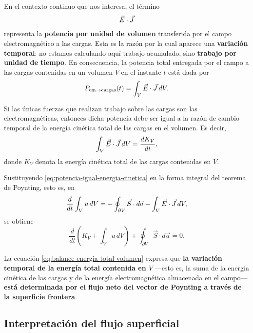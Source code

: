 \documentclass[../main.tex]{subfiles}
\begin{document}
En el contexto continuo que nos interesa, el término
\begin{equation*}
    \vec{E}\cdot\vec{J}
\end{equation*}
representa la \textbf{potencia por unidad de volumen} transferida por el campo electromagnético a las cargas. Esta es la razón por la cual aparece una \textbf{variación temporal}: no estamos calculando aquí trabajo acumulado, sino \textbf{trabajo por unidad de tiempo}. En consecuencia, la potencia total entregada por el campo a las cargas contenidas en un volumen $V$ en el instante $t$ está dada por
\begin{equation*}
    P_{\mathrm{em}\to\mathrm{cargas}}(t)=\int_V \vec{E}\cdot\vec{J}\,dV.
\end{equation*}

Si las únicas fuerzas que realizan trabajo sobre las cargas son las electromagnéticas, entonces dicha potencia debe ser igual a la razón de cambio temporal de la energía cinética total de las cargas en el volumen. Es decir,
\begin{equation}
    \int_V \vec{E}\cdot\vec{J}\,dV=\frac{dK_V}{dt},
    \label{eq:potencia-igual-energia-cinetica}
\end{equation}
donde $K_V$ denota la energía cinética total de las cargas contenidas en $V$.

Sustituyendo \eqref{eq:potencia-igual-energia-cinetica} en la forma integral del teorema de Poynting, esto es, en
\begin{equation*}
    \frac{d}{dt}\int_V u\,dV
    =
    -\oint_{\partial V}\vec S\cdot d\vec a
    -
    \int_V \vec{E}\cdot\vec{J}\,dV,
\end{equation*}
se obtiene
\begin{equation}
    \frac{d}{dt}\left(
        K_V+\int_V u\,dV
    \right)
    +
    \oint_{\partial V}\vec S\cdot d\vec a
    =
    0.
    \label{eq:balance-energia-total-volumen}
\end{equation}

La ecuación \eqref{eq:balance-energia-total-volumen} expresa que \textbf{la variación temporal de la energía total contenida en $V$} ---esto es, la suma de la energía cinética de las cargas y de la energía electromagnética almacenada en el campo--- \textbf{está determinada por el flujo neto del vector de Poynting a través de la superficie frontera}.

\subsection*{Interpretación del flujo superficial}
\end{document}
